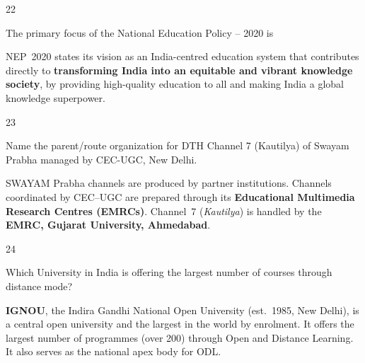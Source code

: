 \begin{question}{22}
{The primary focus of the National Education Policy -- 2020 is\par}
\begin{explain}
NEP~2020 states its vision as an India-centred education system that contributes directly to \textbf{transforming India into an equitable and vibrant knowledge society}, by providing high-quality education to all and making India a global knowledge superpower.
\end{explain}
\end{question}

\begin{question}{23}
{Name the parent/route organization for DTH Channel 7 (Kautilya) of Swayam Prabha managed by CEC-UGC, New Delhi.\par}
\begin{explain}
SWAYAM Prabha channels are produced by partner institutions. Channels coordinated by CEC--UGC are prepared through its \textbf{Educational Multimedia Research Centres (EMRCs)}. Channel~7 (\emph{Kautilya}) is handled by the \textbf{EMRC, Gujarat University, Ahmedabad}.
\end{explain}
\end{question}

\begin{question}{24}
{Which University in India is offering the largest number of courses through distance mode?\par}
\begin{explain}
\textbf{IGNOU}, the Indira Gandhi National Open University (est.~1985, New Delhi), is a central open university and the largest in the world by enrolment. It offers the largest number of programmes (over 200) through Open and Distance Learning. It also serves as the national apex body for ODL.
\end{explain}
\end{question}

